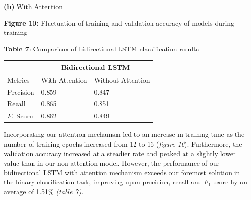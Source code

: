 \documentclass[12pt,a4paper]{article}
\begin{document}
\begin{minipage}{0.5\textwidth}
\begin{minipage}{0.48\textwidth}
\begin{center}
			\hspace{-1cm}\textbf{(b)} With Attention\\
		\end{center}
	\end{minipage}
	\vspace{-5pt}\begin{center}
		\hspace{-20pt}\textbf{Figure 10:} Fluctuation of training and validation accuracy of models during training\\
	\end{center}
\end{minipage}
\hspace{-10pt}
\begin{minipage}{0.5\textwidth}
	\begin{center}
		\textbf{Table 7}: Comparison of bidirectional LSTM classification results\vspace{5pt}
		\begin{tabular}{|p{1.6cm}||p{1.8cm}|p{2cm}|}
			\hline
			& \multicolumn{2}{c|}{Bidirectional LSTM} \\
			\hline
			Metrics & With Attention & Without Attention\\
			\hline\hline
			Precision & 0.859 & 0.847\\
			\hline
			Recall & 0.865 & 0.851\\
			\hline
			$F_1$ Score & 0.862 & 0.849\\
			\hline
		\end{tabular}
	\end{center}	
\end{minipage}\vspace{10pt}

\noindent Incorporating our attention mechanism led to an increase in training time as the number of training epochs increased from 12 to 16 (\textit{figure 10}). Furthermore, the validation accuracy increased at a steadier rate and peaked at a slightly lower value than in our non-attention model. However, the performance of our bidirectional LSTM with attention mechanism exceeds our foremost solution in the binary classification task, improving upon precision, recall and $F_1$ score by an average of 1.51\% \textit{(table 7)}.\\
\end{document}
